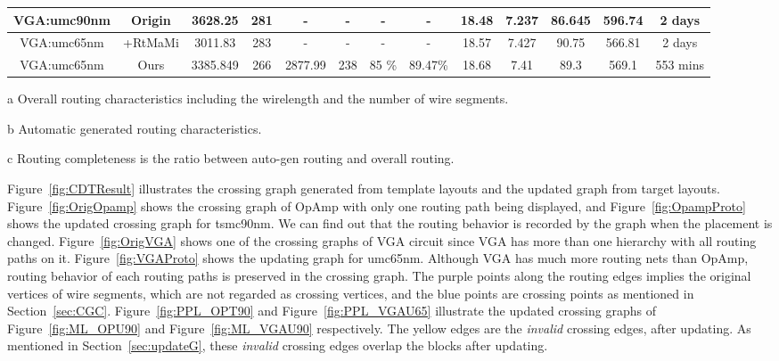 \begin{table}
\begin{threeparttable}
\begin{center}
\begin{tabular}{|c|c|c|c|c|c|c|c|c|c|c|c|c|}
          VGA:umc90nm & Origin &  3628.25  &  281& -&-&- & - & 18.48 & 7.237&86.645 & 596.74 & 2 days \\
          \hline
          VGA:umc65nm & \cite{msc-bhattacharya-tcad06}+RtMaMi &  3011.83& 283 & -& - &- & - & 18.57 & 7.427 &90.75& 566.81&   2 days \\
          \hline
          VGA:umc65nm & Ours & 3385.849& 266 &  2877.99& 238 & 85 \% & 89.47\%&18.68 & 7.41& 89.3 & 569.1& 553 mins  \\
          \hline
        \end{tabular}
        \begin{tablenotes}
          \item [a] Overall routing characteristics including the wirelength and the number of wire segments. 
          \item [b] Automatic generated routing characteristics.
          \item [c] Routing completeness is the ratio between auto-gen routing and overall routing. 
        \end{tablenotes}
        \end{center}
        \end{threeparttable}
      \end{table} 
         

      Figure~\ref{fig:CDTResult} illustrates the crossing graph generated from template layouts and the updated graph from target layouts. Figure~\ref{fig:OrigOpamp} shows the crossing graph of OpAmp with only one routing path being displayed, and Figure~\ref{fig:OpampProto} shows the updated crossing graph for tsmc90nm. We can find out that the routing behavior is recorded by the graph when the placement is changed. Figure~\ref{fig:OrigVGA} shows one of the crossing graphs of VGA circuit since VGA has more than one hierarchy with all routing paths on it. Figure~\ref{fig:VGAProto} shows the updating graph for umc65nm. Although VGA has much more routing nets than OpAmp, routing behavior of each routing paths is preserved in the crossing graph. The purple points along the routing edges implies the original vertices of wire segments, which are not regarded as crossing vertices, and the blue points are crossing points as mentioned in Section~\ref{sec:CGC}. Figure~\ref{fig:PPL_OPT90} and Figure~\ref{fig:PPL_VGAU65} illustrate the updated crossing graphs of Figure~\ref{fig:ML_OPU90} and Figure~\ref{fig:ML_VGAU90} respectively. The yellow edges are the {\it invalid} crossing edges, after updating. As mentioned in Section~\ref{sec:updateG}, these {\it invalid} crossing edges overlap the blocks after updating.

